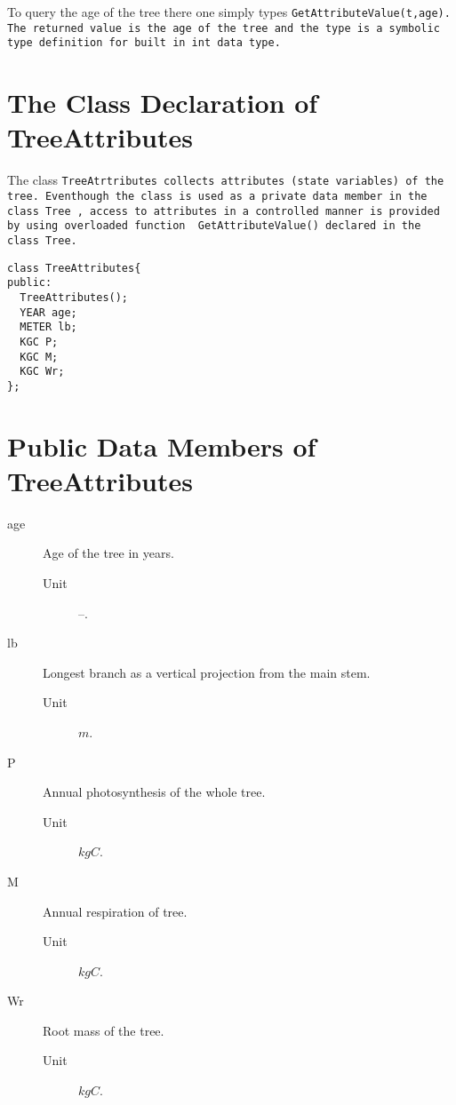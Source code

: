 To query the age of the tree there one simply types
\tt GetAttributeValue(t,age)\rm. The returned value is the 
age of the tree and the type is a symbolic type definition for 
built in int data type.

\section{The Class Declaration of TreeAttributes}

The class \tt TreeAtrtributes \rm collects attributes (state
variables) of the tree. Eventhough the class is used as a private data
member in the class \tt Tree \rm, access to attributes in a controlled
manner is provided by using overloaded function \tt
GetAttributeValue() \rm declared in the class \tt Tree\rm.

\begin{verbatim}
class TreeAttributes{
public:
  TreeAttributes();
  YEAR age;              
  METER lb;              
  KGC P;                 
  KGC M;                
  KGC Wr;              
};
\end{verbatim}

\section{Public Data Members of TreeAttributes}

\begin{description}
  \item [age] Age of the tree in years.
    \begin{description}
      \item[Unit] --.
    \end{description}
  \item [lb]  Longest branch as a vertical projection 
              from the main stem.
    \begin{description}
      \item[Unit] $m$.
    \end{description} 
  \item [P]   Annual photosynthesis of the whole tree.
    \begin{description}
      \item[Unit] $kgC$.
    \end{description} 
  \item [M] Annual respiration of tree.
    \begin{description}
      \item[Unit] $kgC$.
    \end{description}
  \item [Wr]  Root mass of the tree.
    \begin{description}
      \item[Unit] $kgC$.
    \end{description}
\end{description}

